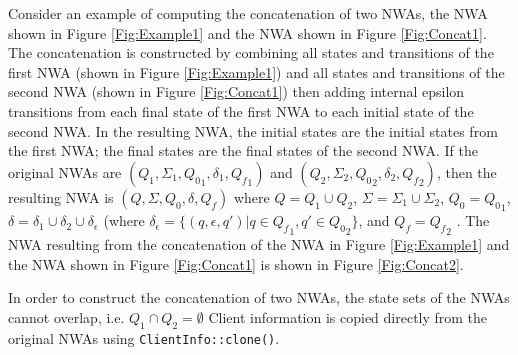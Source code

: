 Consider an example of computing the concatenation of two NWAs, the NWA shown
in Figure \ref{Fig:Example1} and the NWA shown in Figure \ref{Fig:Concat1}.
The concatenation is constructed by combining all states and transitions of
the first NWA (shown in Figure \ref{Fig:Example1}) and all states and
transitions of the second NWA (shown in Figure \ref{Fig:Concat1}) then adding
internal epsilon transitions from each final state of the first NWA to each
initial state of the second NWA.  In the resulting NWA, the initial states
are the initial states from the first NWA; the final states are the final
states of the second NWA.  If the original NWAs are $(Q_1, \Sigma_1,
{Q_0}_1, \delta_1, {Q_f}_1)$ and $(Q_2, \Sigma_2, {Q_0}_2, \delta_2,
{Q_f}_2)$, then the resulting NWA is $(Q, \Sigma, Q_0, \delta, Q_f)$ where $Q
= Q_1 \cup Q_2$, $\Sigma = \Sigma_1 \cup \Sigma_2$, $Q_0 = {Q_0}_1$, $\delta
= \delta_1 \cup \delta_2 \cup \delta_\epsilon$ (where $\delta_\epsilon =
\{(q,\epsilon,q') | q \in {Q_f}_1, q' \in {Q_0}_2\}$, and $Q_f = {Q_f}_2$ .
The NWA resulting from the concatenation of the NWA in Figure
\ref{Fig:Example1} and the NWA shown in Figure \ref{Fig:Concat1} is shown in
Figure \ref{Fig:Concat2}.

In
order to construct the concatenation of two NWAs, the state sets of the NWAs
cannot overlap, i.e. $Q_1 \cap Q_2 = \emptyset$
Client information is copied directly from the original NWAs using
\texttt{ClientInfo::clone()}.


